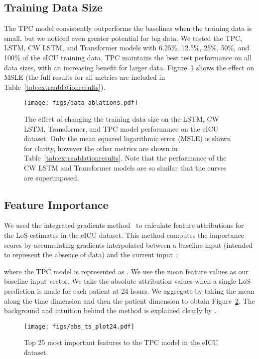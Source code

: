 \documentclass[sigconf]{acmart}
\begin{document}
\subsection{Training Data Size}
The TPC model consistently outperforms the baselines when the training data is small, but we noticed even greater potential for big data. We tested the TPC, LSTM, CW LSTM, and Transformer models with 6.25\%, 12.5\%, 25\%, 50\%, and 100\% of the eICU training data. TPC maintains the best test performance on all data sizes, with an increasing benefit for larger data. Figure~\ref{fig:datasize} shows the effect on MSLE (the full results for all metrics are included in Table~\ref{tab:extraablationresults}).

\begin{figure}[h]
  \centering
  \texttt{[image: figs/data\_ablations.pdf]}
  \caption{The effect of changing the training data size on the LSTM, CW LSTM, Transformer, and TPC model performance on the eICU dataset. Only the mean squared logarithmic error (MSLE) is shown for clarity, however the other metrics are shown in Table~\ref{tab:extraablationresults}. Note that the performance of the CW LSTM and Transformer models are so similar that the curves are superimposed.}
  \label{fig:datasize}
\end{figure}

\subsection{Feature Importance}
We used the integrated gradients method~\citep{integratedgradients} to calculate feature attributions for the LoS estimates in the eICU dataset. This method computes the importance scores  by accumulating gradients interpolated between a baseline input  (intended to represent the absence of data) and the current input :

where the TPC model is represented as . We use the mean feature values as our baseline input vector. We take the absolute attribution values when a single LoS prediction is made for each patient at 24 hours. We aggregate by taking the mean along the time dimension and then the patient dimension to obtain Figure~\ref{fig:featureattr}. The background and intuition behind the method is explained clearly by \citet{sturmfels2020visualizing}. 

\label{sec:featimportance}
\begin{figure}[h]
  \centering
  \hspace{-0.7em}
  \texttt{[image: figs/abs\_ts\_plot24.pdf]}
  \caption{Top 25 most important features to the TPC model in the eICU dataset.}
    \label{fig:featureattr}
\end{figure}
\end{document}
